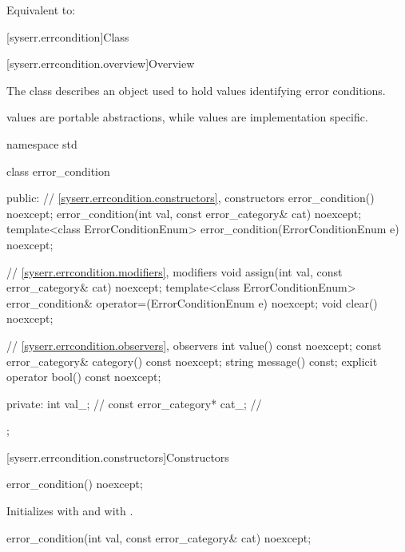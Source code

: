 \begin{itemdescr}
\pnum
\effects
Equivalent to: 
\end{itemdescr}


[syserr.errcondition]{Class }

[syserr.errcondition.overview]{Overview}

\pnum
The class  describes an object used to hold values identifying
error conditions.
\begin{note}
 values are portable abstractions,
while  values are implementation specific.
\end{note}

%
\begin{codeblock}
namespace std {
  class error_condition {
  public:
    // \ref{syserr.errcondition.constructors}, constructors
    error_condition() noexcept;
    error_condition(int val, const error_category& cat) noexcept;
    template<class ErrorConditionEnum>
      error_condition(ErrorConditionEnum e) noexcept;

    // \ref{syserr.errcondition.modifiers}, modifiers
    void assign(int val, const error_category& cat) noexcept;
    template<class ErrorConditionEnum>
      error_condition& operator=(ErrorConditionEnum e) noexcept;
    void clear() noexcept;

    // \ref{syserr.errcondition.observers}, observers
    int value() const noexcept;
    const error_category& category() const noexcept;
    string message() const;
    explicit operator bool() const noexcept;

  private:
    int val_;                   // \expos
    const error_category* cat_; // \expos
  };
}
\end{codeblock}

[syserr.errcondition.constructors]{Constructors}

%
\begin{itemdecl}
error_condition() noexcept;
\end{itemdecl}

\begin{itemdescr}
\pnum
\effects
Initializes  with 
and  with .
\end{itemdescr}

%
\begin{itemdecl}
error_condition(int val, const error_category& cat) noexcept;
\end{itemdecl}

